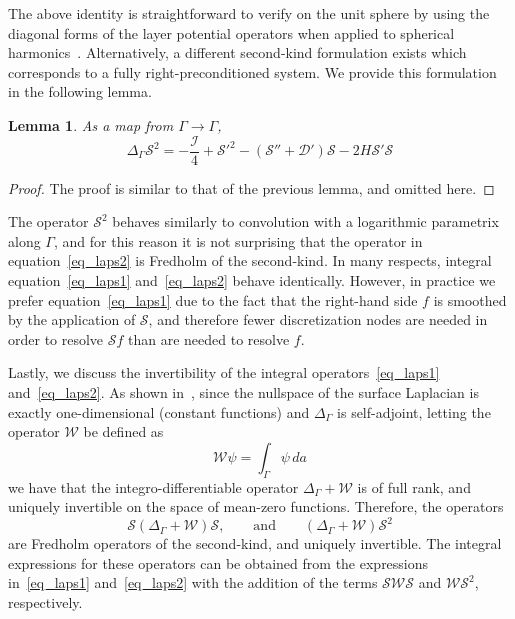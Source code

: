 \documentclass[11pt]{article}
\newcommand{\surflap}{\Delta_\Gamma}
\newcommand{\cI}{\mathcal I}
\newcommand{\cS}{\mathcal S}
\newcommand{\cD}{\mathcal D}
\newcommand{\cW}{\mathcal W}
\newtheorem{lemma}[theorem]{Lemma}
\numberwithin{equation}{section}
\begin{document}
The above identity is straightforward to verify on the unit sphere by
using the diagonal forms of the layer potential operators when applied
to spherical harmonics~\cite{vico_2014}.
Alternatively, a different second-kind formulation exists which
corresponds to a fully right-preconditioned system.
We provide this formulation in the following lemma.
\begin{lemma}
  As a map from $\Gamma\to \Gamma$, 
\begin{equation}\label{eq_laps2}
  \surflap \cS^2 = - \frac{\cI}{4} +\cS'^2 - \left( \cS'' + \cD'
  \right)
  \cS
  - 2H\cS' \cS
\end{equation}
\end{lemma}
\begin{proof}
The proof is similar to that of the previous lemma, and omitted here.
\end{proof}

The operator $\cS^2$ behaves similarly to convolution with
a logarithmic parametrix along $\Gamma$, and for this reason it is not
surprising that the operator in equation~\eqref{eq_laps2} is Fredholm
of the second-kind.
In many respects, integral equation~\eqref{eq_laps1}
and~\eqref{eq_laps2}
behave identically. However, in practice we prefer
equation~\eqref{eq_laps1} due to the fact that the right-hand
side $f$ is smoothed by the application of $\cS$, and therefore fewer
discretization nodes are needed in order to resolve $\cS f$ than are
needed to resolve $f$.

Lastly, we discuss the invertibility of the integral
operators~\eqref{eq_laps1} and~\eqref{eq_laps2}.
As shown in~\cite{imbertgerard_2017, sifuentes_2015},
since the nullspace of the surface Laplacian is exactly
one-dimensional (constant functions) and $\surflap$ is self-adjoint,
letting the operator $\cW$ be defined as
\begin{equation}
\cW \psi = \int_\Gamma \psi \, da
\end{equation}
we have that the integro-differentiable operator $\surflap + \cW$
is of full rank, and uniquely invertible on the space of mean-zero
functions. Therefore, the operators
\begin{equation}
  \cS \left( \surflap + \cW \right) \cS, \qquad\text{and}
  \qquad \left( \surflap + \cW \right) \cS^2
\end{equation}
are Fredholm operators of the second-kind, and uniquely invertible.
The integral expressions for these operators can be obtained from
the expressions in~\eqref{eq_laps1} and~\eqref{eq_laps2} with the
addition of the terms $\cS \cW \cS$ and $\cW \cS^2$, respectively.
\end{document}
